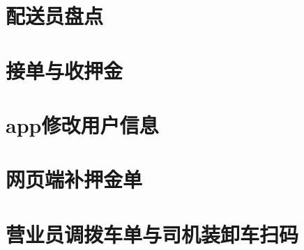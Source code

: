 \documentclass[UTF8]{book}
\begin{document}
	\pagestyle{fancy}
    
	\chapter{配送员盘点}
	
	

	\chapter{接单与收押金}
	
	
	
	\chapter{app修改用户信息}
	
	
	
	\chapter{网页端补押金单}
	
	
	
	\chapter{营业员调拨车单与司机装卸车扫码}
	
	
	
	
\end{document}
